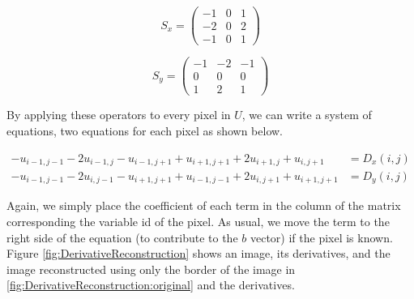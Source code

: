 \documentclass{InsightArticle}
\begin{document}
\begin{figure}[H]
  \begin{minipage}[b]{0.5\linewidth}
    \centering

    \begin{equation}
    S_x =
    \begin{pmatrix}
    -1 & 0 & 1 \\
    -2 & 0 & 2\\
    -1 & 0 & 1
    \end{pmatrix}
    \end{equation}

  \end{minipage}
    \hspace{0.5cm}
  \begin{minipage}[b]{0.5\linewidth}

    \begin{equation}
    S_y =
    \begin{pmatrix}
    -1 & -2 & -1 \\
    0 & 0 & 0\\
    1 & 2 & 1
    \end{pmatrix}
    \end{equation}

  \end{minipage}
\end{figure}

By applying these operators to every pixel in $U$, we can write a system of equations, two equations for each pixel as shown below.

\begin{align}
- u_{i-1,j-1} -2 u_{i-1,j} - u_{i-1,j+1} + u_{i+1,j+1} + 2 u_{i+1,j} + u_{i,j+1} &= D_x(i,j) \\
- u_{i-1,j-1} -2 u_{i,j-1} - u_{i+1,j+1} + u_{i-1,j-1} + 2 u_{i,j+1} + u_{i+1,j+1} &= D_y(i,j)
\end{align}

Again, we simply place the coefficient of each term in the column of the matrix corresponding the variable id of the pixel. As usual, we move the term to the right side of the equation (to contribute to the $b$ vector) if the pixel is known. Figure \ref{fig:DerivativeReconstruction} shows an image, its derivatives, and the image reconstructed using only the border of the image in \ref{fig:DerivativeReconstruction:original} and the derivatives.
\end{document}
